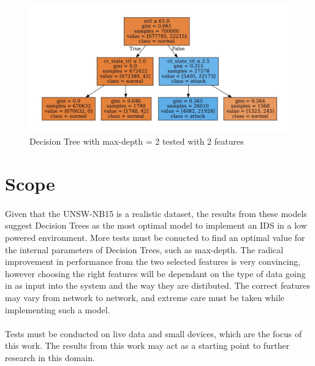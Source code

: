 \begin{figure}[h]
    \hfill\includegraphics[width=1\textwidth]{Chapter5/dtc_md2_2_features}\hspace*{\fill}
    \caption{Decision Tree with max-depth = 2 tested with 2 features}
    \label{dtc_md2_2_features}
\end{figure}

\section{Scope}

\paragraph{}
Given that the UNSW-NB15 is a realistic dataset, the results from these models suggest Decision Trees as the most optimal model to implement an IDS in a low powered environment. More tests must be conucted to find an optimal value for the internal parameters of Decision Trees, such as max-depth. The radical improvement in performance from the two selected features is very convincing, however choosing the right features will be dependant on the type of data going in as input into the system and the way they are distibuted. The correct features may vary from network to network, and extreme care must be taken while implementing such a model.

\paragraph{}
Tests must be conducted on live data and small devices, which are the focus of this work. The results from this work may act as a starting point to further research in this domain.

